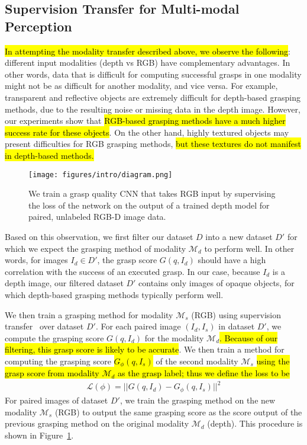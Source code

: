 \subsection{Supervision Transfer for Multi-modal Perception}
\label{sec:suptransfer}
\hl{In attempting the modality transfer described above, we observe the following}: different input modalities (\eg depth vs RGB) have complementary advantages. 
In other words, data that is difficult for computing successful grasps in one modality might not be as difficult for another modality, and vice versa.  For example, transparent and reflective objects are extremely difficult for depth-based grasping methods, due to the resulting noise or missing data in the depth image.  However, our experiments show that \hl{RGB-based grasping methods have a much higher success rate for these objects}.  On the other hand, highly textured objects may present difficulties for RGB grasping methods, \hl{but these textures do not manifest in depth-based methods.}

\begin{figure}[t]
    \centering
    \texttt{[image: figures/intro/diagram.png]}
    \caption{We train a grasp quality CNN that takes RGB input by supervising the loss of the network on the output of a trained depth model for paired, unlabeled RGB-D image data.}
    \label{fig:suptransfer}
\end{figure}

Based on this observation, we first filter our dataset $D$ into a new dataset $D'$ for which we expect the grasping method of modality $\mathcal{M}_d$ to perform well. 
In other words, for images $I_d \in D'$, the grasp score $G(q, I_d)$ should have a high correlation with the success of an executed grasp. In our case, because $I_d$ is a depth image, our filtered dataset $D'$ contains only images of opaque objects, for which depth-based grasping methods typically perform well.

We then train a grasping method for modality $\mathcal{M}_s$ (\eg RGB) using supervision transfer~\cite{gupta2016cross, hoffman2016cross, li2018cross} over dataset $D'$.
For each paired image $(I_d, I_s)$ in dataset $D'$, we compute the grasping score $G(q, I_d)$ for the modality $\mathcal{M}_d$\hl{. Because of our filtering, this grasp score is likely to be accurate}. We then train a method for computing the grasping score \hl{$G_\phi(q, I_s)$} of the second modality $\mathcal{M}_s$ \hl{using the grasp score from modality $\mathcal{M}_d$ as the grasp label; thus we define the loss to be}
\begin{align}
    \mathcal{L}(\phi) = ||G(q, I_d) - G_\phi(q, I_s)||^2
\end{align}
For paired images of dataset $D'$, we train the grasping method on the new modality $\mathcal{M}_s$ (\eg RGB) to output the same grasping score as the score output of the previous grasping method on the original modality $\mathcal{M}_d$ (\eg depth). This procedure is shown in Figure~\ref{fig:suptransfer}.

